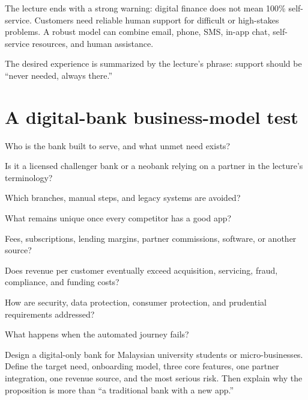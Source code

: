 The lecture ends with a strong warning: digital finance does not mean 100\% self-service. Customers need reliable human support for difficult or high-stakes problems. A robust model can combine email, phone, SMS, in-app chat, self-service resources, and human assistance.

The desired experience is summarized by the lecture's phrase: support should be ``never needed, always there.''

\section{A digital-bank business-model test}

\begin{utpsteps}
  \item {} Who is the bank built to serve, and what unmet need exists?
  \item {} Is it a licensed challenger bank or a neobank relying on a partner in the lecture's terminology?
  \item {} Which branches, manual steps, and legacy systems are avoided?
  \item {} What remains unique once every competitor has a good app?
  \item {} Fees, subscriptions, lending margins, partner commissions, software, or another source?
  \item {} Does revenue per customer eventually exceed acquisition, servicing, fraud, compliance, and funding costs?
  \item {} How are security, data protection, consumer protection, and prudential requirements addressed?
  \item {} What happens when the automated journey fails?
\end{utpsteps}

\begin{tryit}
Design a digital-only bank for Malaysian university students or micro-businesses. Define the target need, onboarding model, three core features, one partner integration, one revenue source, and the most serious risk. Then explain why the proposition is more than ``a traditional bank with a new app.''
\end{tryit}

